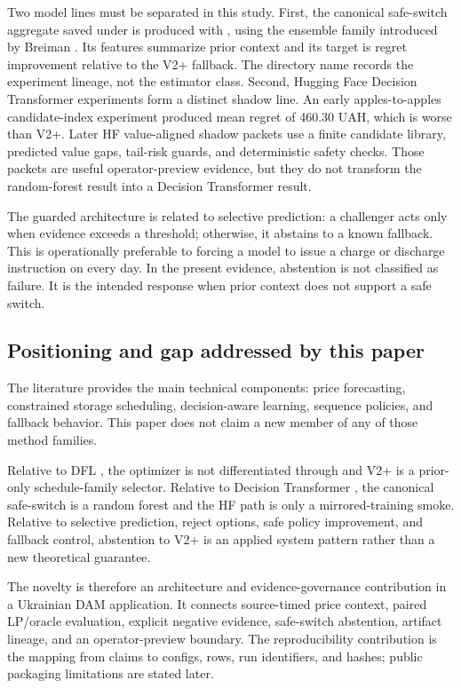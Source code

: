 Two model lines must be separated in this study. First, the canonical safe-switch aggregate saved under  is produced with , using the ensemble family introduced by Breiman \cite{breiman2001randomforests}. Its features summarize prior context and its target is regret improvement relative to the V2+ fallback. The directory name records the experiment lineage, not the estimator class. Second, Hugging Face Decision Transformer experiments form a distinct shadow line. An early apples-to-apples candidate-index experiment produced mean regret of 460.30 UAH, which is worse than V2+. Later HF value-aligned shadow packets use a finite candidate library, predicted value gaps, tail-risk guards, and deterministic safety checks. Those packets are useful operator-preview evidence, but they do not transform the random-forest result into a Decision Transformer result.

The guarded architecture is related to selective prediction: a challenger acts only when evidence exceeds a threshold; otherwise, it abstains to a known fallback. This is operationally preferable to forcing a model to issue a charge or discharge instruction on every day. In the present evidence, abstention is not classified as failure. It is the intended response when prior context does not support a safe switch.

\subsection{Positioning and gap addressed by this paper}

The literature provides the main technical components: price forecasting, constrained storage scheduling, decision-aware learning, sequence policies, and fallback behavior. This paper does not claim a new member of any of those method families.

Relative to DFL \cite{elmachtoub2022spo,mandi2024dfl,sang2022essdfl}, the optimizer is not differentiated through and V2+ is a prior-only schedule-family selector. Relative to Decision Transformer \cite{chen2021dt,bhargava2023whendt}, the canonical safe-switch is a random forest and the HF path is only a mirrored-training smoke. Relative to selective prediction, reject options, safe policy improvement, and fallback control, abstention to V2+ is an applied system pattern rather than a new theoretical guarantee.

The novelty is therefore an architecture and evidence-governance contribution in a Ukrainian DAM application. It connects source-timed price context, paired LP/oracle evaluation, explicit negative evidence, safe-switch abstention, artifact lineage, and an operator-preview boundary. The reproducibility contribution is the mapping from claims to configs, rows, run identifiers, and hashes; public packaging limitations are stated later.

